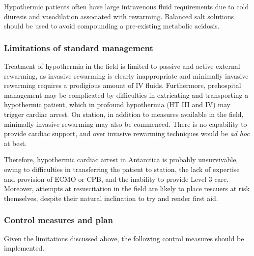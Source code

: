 \documentclass[12pt,a4paper]{article}
\begin{document}
Hypothermic patients often have large intravenous fluid requirements due to cold diuresis and vasodilation associated with rewarming.\cite{Soar:2010kd} Balanced salt solutions should be used to avoid compounding a pre-existing metabolic acidosis.\cite{PowellTuck:2011us}

\subsubsection{Limitations of standard management}

Treatment of hypothermia in the field is limited to passive and active external rewarming, as invasive rewarming is clearly inappropriate and minimally invasive rewarming requires a prodigious amount of IV fluids. Furthermore, prehospital management may be complicated by difficulties in extricating and transporting a hypothermic patient, which in profound hypothermia (HT III and IV) may trigger cardiac arrest. On station, in addition to measures available in the field, minimally invasive rewarming may also be commenced. There is no capability to provide cardiac support, and over invasive rewarming techniques would be \emph{ad hoc} at best.

Therefore, hypothermic cardiac arrest in Antarctica is probably unsurvivable, owing to difficulties in transferring the patient to station, the lack of expertise and provision of ECMO or CPB, and the inability to provide Level 3 care. Moreover, attempts at resuscitation in the field are likely to place rescuers at risk themselves, despite their natural inclination to try and render first aid.

\subsubsection{Control measures and plan}

Given the limitations discussed above, the following control measures should be implemented.
\end{document}
